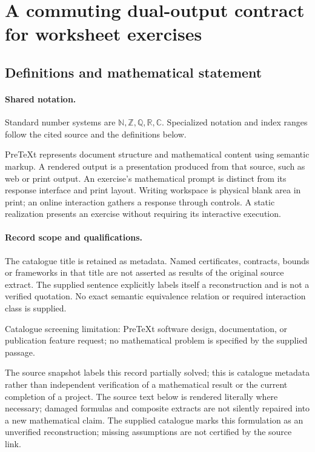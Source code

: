 \documentclass[11pt]{article}
\begin{document}
\section{A commuting dual-output contract for worksheet exercises}\label{statement}

\subsection{Definitions and mathematical statement}

\paragraph{Shared notation.}Standard number systems are $\mathbb N,\mathbb Z,\mathbb Q,\mathbb R,\mathbb C$. Specialized notation and index ranges follow the cited source and the definitions below.


PreTeXt represents document structure and mathematical content using semantic markup. A rendered output is a presentation produced from that source, such as web or print output. An exercise's mathematical prompt is distinct from its response interface and print layout. Writing workspace is physical blank area in print; an online interaction gathers a response through controls. A static realization presents an exercise without requiring its interactive execution.
\paragraph{Record scope and qualifications.}
The catalogue title is retained as metadata. Named certificates, contracts, bounds or frameworks in that title are not asserted as results of the original source extract.
The supplied sentence explicitly labels itself a reconstruction and is not a verified quotation. No exact semantic equivalence relation or required interaction class is supplied.

Catalogue screening limitation: PreTeXt software design, documentation, or publication feature request; no mathematical problem is specified by the supplied passage.

The source snapshot labels this record partially solved; this is catalogue metadata rather than independent verification of a mathematical result or the current completion of a project.
The source text below is rendered literally where necessary; damaged formulas and composite extracts are not silently repaired into a new mathematical claim.
The supplied catalogue marks this formulation as an unverified reconstruction; missing assumptions are not certified by the source link.
\end{document}
